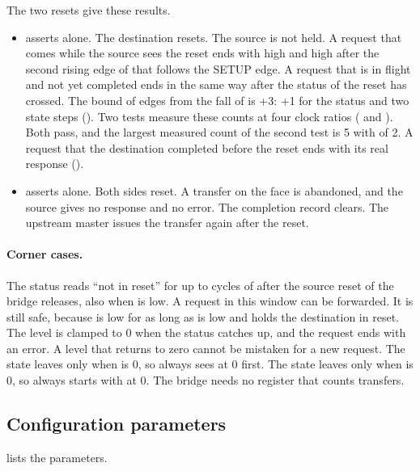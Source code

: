 The two resets give these results.
\begin{itemize}
  \item {} asserts alone. The destination resets. The source is not held. A request that comes while the source sees the reset ends with  high and  high after the second rising edge of  that follows the SETUP edge. A request that is in flight and not yet completed ends in the same way after the status of the reset has crossed. The bound of edges from the fall of  is +3: +1 for the status and two state steps (). Two tests measure these counts at four clock ratios ( and ). Both pass, and the largest measured count of the second test is 5 with  of 2. A request that the destination completed before the reset ends with its real response ().
  \item {} asserts alone. Both sides reset. A transfer on the  face is abandoned, and the source gives no response and no error. The completion record clears. The upstream master issues the transfer again after the reset.
\end{itemize}

\paragraph{Corner cases.} The status  reads ``not in reset'' for up to  cycles of  after the source reset of the bridge releases, also when  is low. A request in this window can be forwarded. It is still safe, because  is low for as long as  is low and holds the destination in reset. The level  is clamped to 0 when the status catches up, and the request ends with an error. A level that returns to zero cannot be mistaken for a new request. The state  leaves only when  is 0, so  always sees  at 0 first. The state  leaves only when  is 0, so  always starts with  at 0. The bridge needs no register that counts transfers.

\subsection{Configuration parameters}
 lists the parameters.

